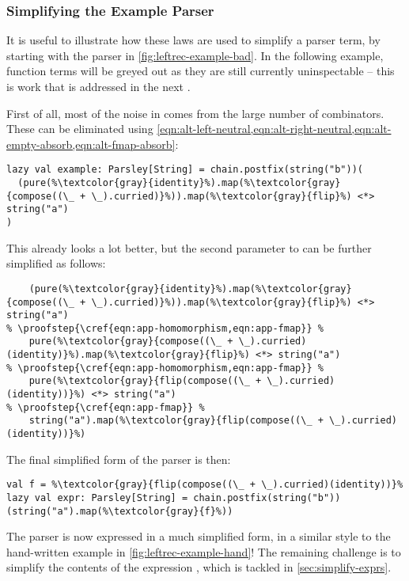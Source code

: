 \documentclass[../../../main.tex]{subfiles}
\begin{document}
\subsubsection{Simplifying the Example Parser}\label{sec:simplify-example}
It is useful to illustrate how these laws are used to simplify a parser term, by starting with the parser in \cref{fig:leftrec-example-bad}.
In the following example, function terms will be greyed out as they are still currently uninspectable -- this is work that is addressed in the next .

First of all, most of the noise in  comes from the large number of  combinators.
These can be eliminated using \cref{eqn:alt-left-neutral,eqn:alt-right-neutral,eqn:alt-empty-absorb,eqn:alt-fmap-absorb}:
\begin{verbatim}
lazy val example: Parsley[String] = chain.postfix(string("b"))(
  (pure(%\textcolor{gray}{identity}%).map(%\textcolor{gray}{compose((\_ + \_).curried)}%)).map(%\textcolor{gray}{flip}%) <*> string("a")
)
\end{verbatim}
%
This already looks a lot better, but the second parameter to  can be further simplified as follows:
\begin{verbatim}
    (pure(%\textcolor{gray}{identity}%).map(%\textcolor{gray}{compose((\_ + \_).curried)}%)).map(%\textcolor{gray}{flip}%) <*> string("a")
% \proofstep{\cref{eqn:app-homomorphism,eqn:app-fmap}} %
    pure(%\textcolor{gray}{compose((\_ + \_).curried)(identity)}%).map(%\textcolor{gray}{flip}%) <*> string("a")
% \proofstep{\cref{eqn:app-homomorphism,eqn:app-fmap}} %
    pure(%\textcolor{gray}{flip(compose((\_ + \_).curried)(identity))}%) <*> string("a")
% \proofstep{\cref{eqn:app-fmap}} %
    string("a").map(%\textcolor{gray}{flip(compose((\_ + \_).curried)(identity))}%)
\end{verbatim}
%
The final simplified form of the parser is then:
\begin{verbatim}
val f = %\textcolor{gray}{flip(compose((\_ + \_).curried)(identity))}%
lazy val expr: Parsley[String] = chain.postfix(string("b"))(string("a").map(%\textcolor{gray}{f}%))
\end{verbatim}
%
The parser is now expressed in a much simplified form, in a similar style to the hand-written example in \cref{fig:leftrec-example-hand}!
The remaining challenge is to simplify the contents of the expression , which is tackled in \cref{sec:simplify-exprs}.
\end{document}
